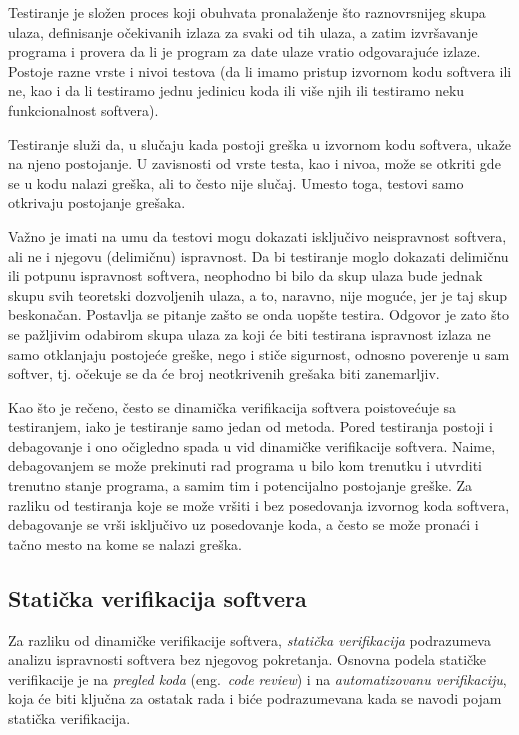 \documentclass[a4paper]{article}
\theoremstyle{definition}
\begin{document}
{\par Testiranje je složen proces koji obuhvata pronalaženje što raznovrsnijeg skupa ulaza, definisanje očekivanih izlaza za svaki od tih ulaza, a zatim izvršavanje programa i provera da li je program za date ulaze vratio odgovarajuće izlaze. Postoje razne vrste i nivoi testova (da li imamo pristup izvornom kodu softvera ili ne, kao i da li testiramo jednu jedinicu koda ili više njih ili testiramo neku funkcionalnost softvera).

\par Testiranje služi da, u slučaju kada postoji greška u izvornom kodu softvera, ukaže na njeno postojanje. U zavisnosti od vrste testa, kao i nivoa, može se otkriti gde se u kodu nalazi greška, ali to često nije slučaj. Umesto toga, testovi samo otkrivaju postojanje grešaka.

\par Važno je imati na umu da testovi mogu dokazati isključivo neispravnost softvera, ali ne i njegovu (delimičnu) ispravnost. Da bi testiranje moglo dokazati delimičnu ili potpunu ispravnost softvera, neophodno bi bilo da skup ulaza bude jednak skupu svih teoretski dozvoljenih ulaza, a to, naravno, nije moguće, jer je taj skup beskonačan. Postavlja se pitanje zašto se onda uopšte testira. Odgovor je zato što se pažljivim odabirom skupa ulaza za koji će biti testirana ispravnost izlaza ne samo otklanjaju postojeće greške, nego i stiče sigurnost, odnosno poverenje u sam softver, tj. očekuje se da će broj neotkrivenih grešaka biti zanemarljiv.

\par Kao što je rečeno, često se dinamička verifikacija softvera poistovećuje sa testiranjem, iako je testiranje samo jedan od metoda. Pored testiranja postoji i debagovanje i ono očigledno spada u vid dinamičke verifikacije softvera. Naime, debagovanjem se može prekinuti rad programa u bilo kom trenutku i utvrditi trenutno stanje programa, a samim tim i potencijalno postojanje greške. Za razliku od testiranja koje se može vršiti i bez posedovanja izvornog koda softvera, debagovanje se vrši isključivo uz posedovanje koda, a često se može pronaći i tačno mesto na kome se nalazi greška.

\subsection{Statička verifikacija softvera}
\label{subsec:staticka}

\par Za razliku od dinamičke verifikacije softvera, \textit{statička verifikacija} podrazumeva analizu ispravnosti softvera bez njegovog pokretanja. Osnovna podela statičke verifikacije je na \textit{pregled koda} (eng.~{\em code review}) i na \textit{automatizovanu verifikaciju}, koja će biti ključna za ostatak rada i biće podrazumevana kada se navodi pojam statička verifikacija.

}
\end{document}
